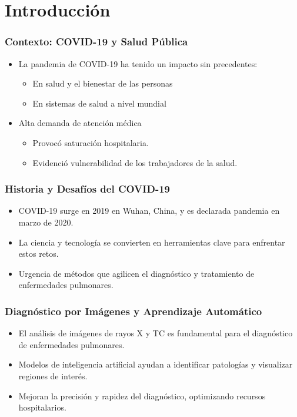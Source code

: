 
\section{Introducción}

\begin{frame}
\frametitle{Contexto: COVID-19 y Salud Pública}
\begin{itemize}
    \item La pandemia de COVID-19 ha tenido un impacto sin precedentes:
    \begin{itemize}
        \item En salud y el bienestar de las personas
        \item En sistemas de salud a nivel mundial
    \end{itemize}
\end{itemize}

\begin{itemize}
    \item Alta demanda de atención médica
    \begin{itemize}
        \item Provocó saturación hospitalaria.
        \item Evidenció vulnerabilidad de los trabajadores de la salud.
    \end{itemize}
\end{itemize}
\end{frame}

\begin{frame}
\frametitle{Historia y Desafíos del COVID-19}
\begin{itemize}
    \item COVID-19 surge en 2019 en Wuhan, China, y es declarada pandemia en marzo de 2020.
    \item La ciencia y tecnología se convierten en herramientas clave para enfrentar estos retos.
    \item Urgencia de métodos que agilicen el diagnóstico y tratamiento de enfermedades pulmonares.
\end{itemize}
\end{frame}

\begin{frame}
\frametitle{Diagnóstico por Imágenes y Aprendizaje Automático}
\begin{itemize}
    \item El análisis de imágenes de rayos X y TC es fundamental para el diagnóstico de enfermedades pulmonares.
    \item Modelos de inteligencia artificial ayudan a identificar patologías y visualizar regiones de interés.
    \item Mejoran la precisión y rapidez del diagnóstico, optimizando recursos hospitalarios.
\end{itemize}
\end{frame}

